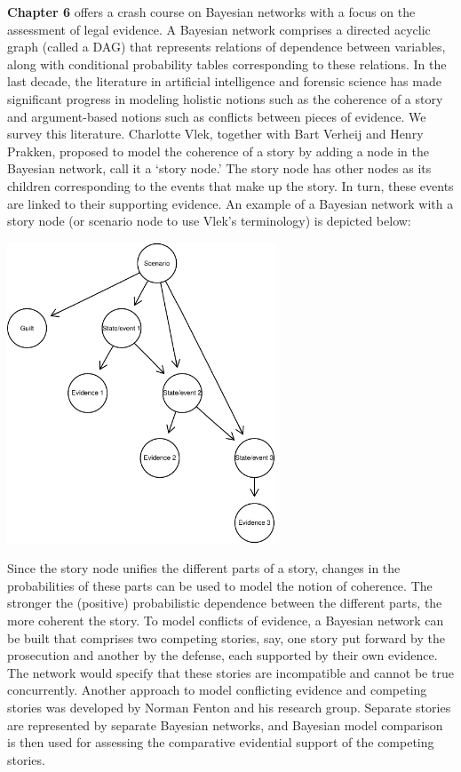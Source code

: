 \documentclass[
  10pt,
  dvipsnames,enabledeprecatedfontcommands]{scrartcl}
\begin{document}
\textbf{Chapter 6} offers a crash course on Bayesian networks with a
focus on the assessment of legal evidence. A Bayesian network comprises
a directed acyclic graph (called a DAG) that represents relations of
dependence between variables, along with conditional probability tables
corresponding to these relations. In the last decade, the literature in
artificial intelligence and forensic science has made significant
progress in modeling holistic notions such as the coherence of a story
and argument-based notions such as conflicts between pieces of evidence.
We survey this literature. Charlotte Vlek, together with Bart Verheij
and Henry Prakken, proposed to model the coherence of a story by adding
a node in the Bayesian network, call it a `story node.' The story node
has other nodes as its children corresponding to the events that make up
the story. In turn, these events are linked to their supporting
evidence. An example of a Bayesian network with a story node (or
scenario node to use Vlek's terminology) is depicted below:

\begin{center}
\includegraphics[width=8cm]{vlek-scenario-node.pdf}
 \end{center}

Since the story node unifies the different parts of a story, changes in
the probabilities of these parts can be used to model the notion of
coherence. The stronger the (positive) probabilistic dependence between
the different parts, the more coherent the story. To model conflicts of
evidence, a Bayesian network can be built that comprises two competing
stories, say, one story put forward by the prosecution and another by
the defense, each supported by their own evidence. The network would
specify that these stories are incompatible and cannot be true
concurrently. Another approach to model conflicting evidence and
competing stories was developed by Norman Fenton and his research group.
Separate stories are represented by separate Bayesian networks, and
Bayesian model comparison is then used for assessing the comparative
evidential support of the competing stories.
\end{document}
